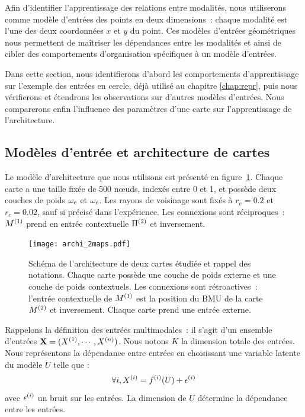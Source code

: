 \documentclass[../main]{subfiles}
\begin{document}
Afin d'identifier l'apprentissage des relations entre modalités, nous utiliserons comme modèle d'entrées des points en deux dimensions~: chaque modalité est l'une des deux coordonnées $x$ et $y$ du point.
Ces modèles d'entrées géométriques nous permettent de maîtriser les dépendances entre les modalités et ainsi de cibler des comportements d'organisation spécifiques à un modèle d'entrées.

Dans cette section, nous identifierons d'abord les comportements d'apprentissage sur l'exemple des entrées en cercle, déjà utilisé au chapitre \ref{chap:repr}, puis nous vérifierons et étendrons les observations sur d'autres modèles d'entrées.
Nous comparerons enfin l'influence des paramètres d'une carte sur l'apprentissage de l'architecture.

\subsection{Modèles d'entrée et architecture de cartes}

Le modèle d'architecture que nous utilisons est présenté en figure~\ref{fig:archis}.
Chaque carte a une taille fixée de 500 n\oe{}uds, indexés entre 0 et 1, et possède deux couches de poids $\omega_e$ et $\omega_c$. Les rayons de voisinage sont fixés à $r_e = 0.2$ et $r_c = 0.02$, sauf si précisé dans l'expérience.
Les connexions sont réciproques~: $M^{({1})}$ prend en entrée contextuelle $\Pi^{({2})}$ et inversement.

\begin{figure}[t]
	\centering\texttt{[image: archi\_2maps.pdf]}
	\caption{Schéma de l'architecture de deux cartes étudiée et rappel des notations. Chaque carte possède une couche de poids externe et une couche de poids contextuels. Les connexions sont rétroactives~: l'entrée contextuelle de $M^{({1})}$ est la position du BMU de la carte $M^{({2})}$ et inversement. Chaque carte prend une entrée externe.\label{fig:archis}}
\end{figure}

Rappelons la définition des entrées multimodales~: il s'agit d'un ensemble d'entrées $\mathbf{X} = (X^{({1})}, \cdots, X^{({n})})$. 
Nous notons $K$ la dimension totale des entrées.
Nous représentons la dépendance entre entrées en choisissant une variable latente du modèle $U$ telle que :
$$ \forall i, X^{({i})} = f^{({i})}(U) + \epsilon^{({i})}$$
avec $\epsilon^{({i})}$ un bruit sur les entrées.
La dimension de $U$ détermine la dépendance entre les entrées.
\end{document}
